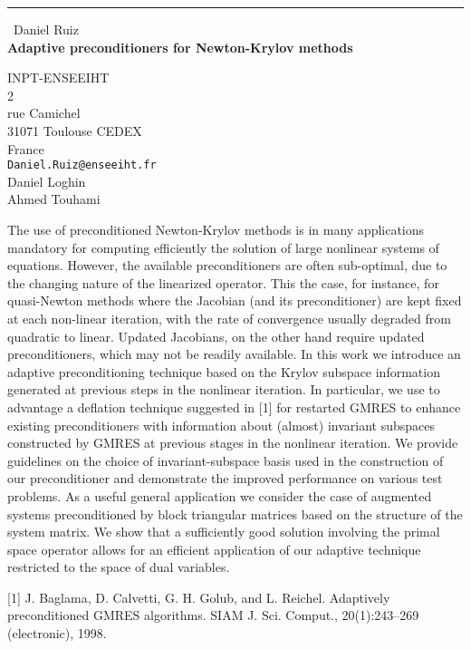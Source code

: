 \documentclass{report}
\begin{document}
\begin{center}
\rule{6in}{1pt} \
{\large Daniel Ruiz \\
{\bf Adaptive preconditioners for Newton-Krylov methods}}

INPT-ENSEEIHT \\ 2 \\ rue Camichel \\ 31071 Toulouse CEDEX \\ France
\\
{\tt Daniel.Ruiz@enseeiht.fr}\\
Daniel Loghin\\
Ahmed Touhami\end{center}

The use of preconditioned Newton-Krylov methods is in many applications
mandatory for computing efficiently the solution of large nonlinear
systems of equations. However, the available preconditioners are often
sub-optimal, due to the changing nature of the linearized operator. This
the case, for instance, for quasi-Newton methods where the Jacobian (and
its preconditioner) are kept fixed at each non-linear iteration, with the
rate of convergence usually degraded from quadratic to linear. Updated
Jacobians, on the other hand require updated preconditioners, which may
not be readily available. In this work we introduce an adaptive
preconditioning technique based on the Krylov subspace information
generated at previous steps in the nonlinear iteration. In particular, we
use to advantage a deflation technique suggested in [1] for restarted
GMRES to enhance existing preconditioners with information about (almost)
invariant subspaces constructed by GMRES at previous stages in the
nonlinear iteration. We provide guidelines on the choice of
invariant-subspace basis used in the construction of our preconditioner
and demonstrate the improved performance on various test problems. As a
useful general application we consider the case of augmented systems
preconditioned by block triangular matrices based on the structure of the
system matrix. We show that a sufficiently good solution involving the
primal space operator allows for an efficient application of our adaptive
technique restricted to the space of dual variables.


[1] J. Baglama, D. Calvetti, G. H. Golub, and L. Reichel.
Adaptively preconditioned GMRES algorithms.
SIAM J. Sci. Comput., 20(1):243--269 (electronic), 1998.
\end{document}
